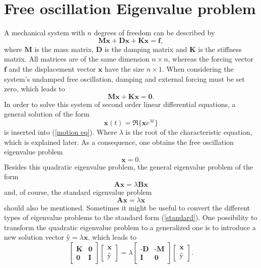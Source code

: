 \documentclass[conference]{journal}
\begin{document}
	\section{Free oscillation Eigenvalue problem}
	A mechanical system with $n$ degrees of freedom can be described by 
	\begin{equation}\label{motion eq}
	\textbf{M\"x}+\textbf{D\.{x}}+\textbf{Kx}=\textbf{f},
	\end{equation}
	where $\mathrm{\textbf{M}}$ is the mass matrix, $\mathrm{\textbf{D}}$ is the damping matrix and $\mathrm{\textbf{K}}$ is the stiffness matrix. All matrices are of the same dimension $n \times n$, whereas the forcing vector $\textbf{f}$ and the displacement vector $\textbf{x}$ have the size $n \times 1$. When considering the system's undamped free oscillation, damping and external forcing must be set zero, which leads to
	\begin{equation}
	\textbf{M\"x}+\textbf{Kx}=\textbf{0}.
	\end{equation}
	In order to solve this system of second order linear differential equations, a general solution of the form
	\begin{equation}
	\textbf{x}(t)=\Re\{\textbf{\^x}e^{\lambda t}\}
	\end{equation}
	is inserted into (\ref{motion eq}). Where $\lambda$ is the root of the characteristic equation, which is explained later. As a consequence, one obtains the free oscillation eigenvalue problem
	\begin{equation}
	[\textbf{K}+\lambda^2 \textbf{M}]\textbf{\^x}=0.
	\end{equation}
	Besides this quadratic eigenvalue problem, the general eigenvalue problem of the form
	\begin{equation}
	\textbf{A\^x}=\lambda\textbf{B\^x}
	\end{equation}
	and, of course, the standard eigenvalue problem
	\begin{equation}\label{standard}
	\textbf{A\^x}=\lambda\textbf{\^x}
	\end{equation}
	should also be mentioned. Sometimes it might be useful to convert the different types of eigenvalue problems to the standard form (\ref{standard}). One possibility to transform the quadratic eigenvalue problem to a generalized one is to introduce a new solution vector $\textbf{\^y}=\lambda\textbf{\^x}$, which leads to
	\begin{equation}
	\begin{bmatrix}
	\textbf{K} & \textbf{0} \\
	\textbf{0} & \textbf{I}
	\end{bmatrix}
	\begin{bmatrix}
	\textbf{\^x} \\
	\textbf{\^y}
	\end{bmatrix}
	=\lambda
	\begin{bmatrix}
	\textbf{-D} & \textbf{-M} \\
	\textbf{I} & \textbf{0}
	\end{bmatrix}
	\begin{bmatrix}
	\textbf{\^x} \\
	\textbf{\^y}
	\end{bmatrix}.
	\end{equation}
\end{document}
